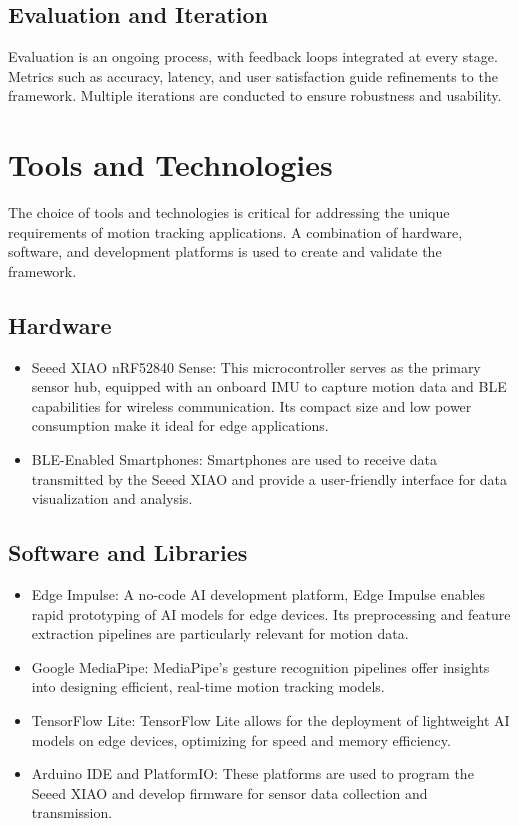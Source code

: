 \subsection{Evaluation and Iteration}
Evaluation is an ongoing process, with feedback loops integrated at every stage. Metrics such as accuracy, latency, and user satisfaction guide refinements to the framework. Multiple iterations are conducted to ensure robustness and usability.

\section{Tools and Technologies}
The choice of tools and technologies is critical for addressing the unique requirements of motion tracking applications. A combination of hardware, software, and development platforms is used to create and validate the framework.

\subsection{Hardware}
\begin{itemize}
    \item Seeed XIAO nRF52840 Sense:
    This microcontroller serves as the primary sensor hub, equipped with an onboard IMU to capture motion data and BLE capabilities for wireless communication. Its compact size and low power consumption make it ideal for edge applications.
    \item BLE-Enabled Smartphones:
    Smartphones are used to receive data transmitted by the Seeed XIAO and provide a user-friendly interface for data visualization and analysis.
\end{itemize}

\subsection{Software and Libraries}
\begin{itemize}
    \item Edge Impulse:
    A no-code AI development platform, Edge Impulse enables rapid prototyping of AI models for edge devices. Its preprocessing and feature extraction pipelines are particularly relevant for motion data.
    \item Google MediaPipe:
    MediaPipe's gesture recognition pipelines offer insights into designing efficient, real-time motion tracking models.
    \item TensorFlow Lite:
    TensorFlow Lite allows for the deployment of lightweight AI models on edge devices, optimizing for speed and memory efficiency.
    \item Arduino IDE and PlatformIO:
    These platforms are used to program the Seeed XIAO and develop firmware for sensor data collection and transmission.
\end{itemize}

